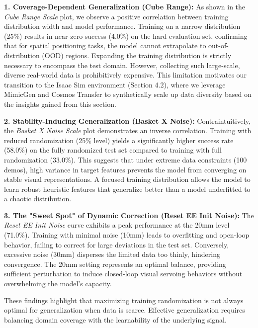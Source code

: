 \documentclass{article} %
\begin{document}
{\bfseries 1. Coverage-Dependent Generalization (Cube Range):}
As shown in the \textit{Cube Range Scale} plot, we observe a positive correlation between training distribution width and model performance. Training on a narrow distribution (25\%) results in near-zero success (4.0\%) on the hard evaluation set, confirming that for spatial positioning tasks, the model cannot extrapolate to out-of-distribution (OOD) regions. Expanding the training distribution is strictly necessary to encompass the test domain. However, collecting such large-scale, diverse real-world data is prohibitively expensive. This limitation motivates our transition to the Isaac Sim environment (Section 4.2), where we leverage MimicGen and Cosmos Transfer to synthetically scale up data diversity based on the insights gained from this section. 

{\bfseries 2. Stability-Inducing Generalization (Basket X Noise):}
Contraintuitively, the \textit{Basket X Noise Scale} plot demonstrates an inverse correlation. Training with reduced randomization (25\% level) yields a significantly higher success rate (58.0\%) on the fully randomized test set compared to training with full randomization (33.0\%). This suggests that under extreme data constraints (100 demos), high variance in target features prevents the model from converging on stable visual representations. A focused training distribution allows the model to learn robust heuristic features that generalize better than a model underfitted to a chaotic distribution.

{\bfseries 3. The "Sweet Spot" of Dynamic Correction (Reset EE Init Noise):}
The \textit{Reset EE Init Noise} curve exhibits a peak performance at the 20mm level (71.0\%). Training with minimal noise (10mm) leads to overfitting and open-loop behavior, failing to correct for large deviations in the test set. Conversely, excessive noise (30mm) disperses the limited data too thinly, hindering convergence. The 20mm setting represents an optimal balance, providing sufficient perturbation to induce closed-loop visual servoing behaviors without overwhelming the model's capacity.

These findings highlight that maximizing training randomization is not always optimal for generalization when data is scarce. Effective generalization requires balancing domain coverage with the learnability of the underlying signal.


\end{document}
